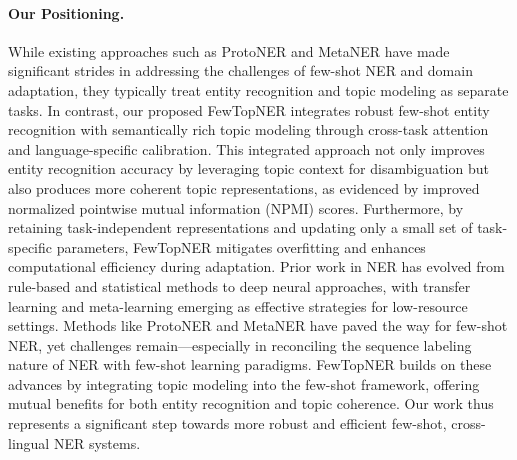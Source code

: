 \paragraph{Our Positioning.}  
While existing approaches such as ProtoNER and MetaNER have made significant strides in addressing the challenges of few-shot NER and domain adaptation, they typically treat entity recognition and topic modeling as separate tasks. In contrast, our proposed FewTopNER integrates robust few-shot entity recognition with semantically rich topic modeling through cross-task attention and language-specific calibration. This integrated approach not only improves entity recognition accuracy by leveraging topic context for disambiguation but also produces more coherent topic representations, as evidenced by improved normalized pointwise mutual information (NPMI) scores. Furthermore, by retaining task-independent representations and updating only a small set of task-specific parameters, FewTopNER mitigates overfitting and enhances computational efficiency during adaptation.
Prior work in NER has evolved from rule-based and statistical methods to deep neural approaches, with transfer learning and meta-learning emerging as effective strategies for low-resource settings. Methods like ProtoNER and MetaNER have paved the way for few-shot NER, yet challenges remain—especially in reconciling the sequence labeling nature of NER with few-shot learning paradigms. FewTopNER builds on these advances by integrating topic modeling into the few-shot framework, offering mutual benefits for both entity recognition and topic coherence. Our work thus represents a significant step towards more robust and efficient few-shot, cross-lingual NER systems.